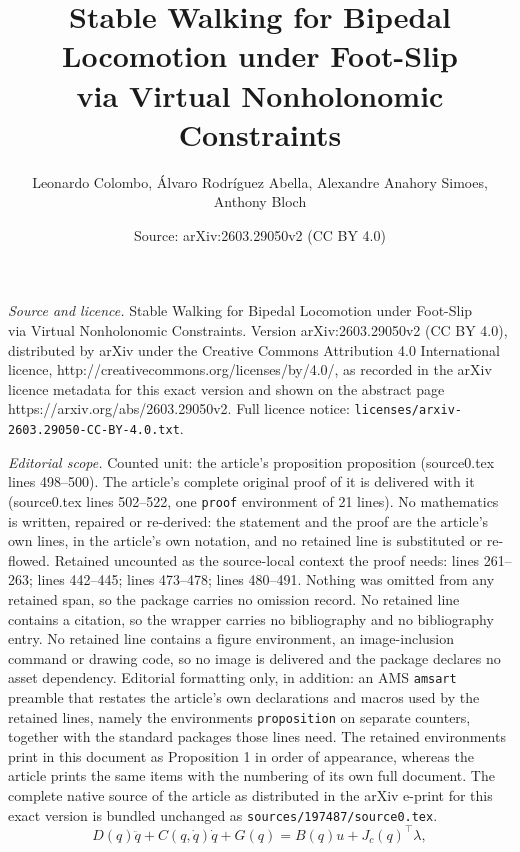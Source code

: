 \documentclass[10pt,a4paper]{amsart}
\title{Stable Walking for Bipedal Locomotion under Foot-Slip\\ via Virtual Nonholonomic Constraints}
\author{Leonardo Colombo, \'Alvaro Rodr\'iguez Abella, Alexandre Anahory Simoes, Anthony Bloch}
\date{Source: arXiv:2603.29050v2 (CC BY 4.0)}
\begin{document}
\maketitle

\noindent\emph{Source and licence.} Stable Walking for Bipedal Locomotion under Foot-Slip\\ via Virtual Nonholonomic Constraints. Version arXiv:2603.29050v2 (CC BY 4.0), distributed by arXiv under the Creative Commons Attribution 4.0 International licence, http://creativecommons.org/licenses/by/4.0/, as recorded in the arXiv licence metadata for this exact version and shown on the abstract page https://arxiv.org/abs/2603.29050v2. Full licence notice: \texttt{licenses/arxiv-2603.29050-CC-BY-4.0.txt}.\par\smallskip

\noindent\textit{Editorial scope.} Counted unit: the article's proposition proposition (source0.tex lines 498--500). The article's complete original proof of it is delivered with it (source0.tex lines 502--522, one \texttt{proof} environment of 21 lines). No mathematics is written, repaired or re-derived: the statement and the proof are the article's own lines, in the article's own notation, and no retained line is substituted or re-flowed.  Retained uncounted as the source-local context the proof needs: lines 261--263; lines 442--445; lines 473--478; lines 480--491.  Nothing was omitted from any retained span, so the package carries no omission record.  No retained line contains a citation, so the wrapper carries no bibliography and no bibliography entry.  No retained line contains a figure environment, an image-inclusion command or drawing code, so no image is delivered and the package declares no asset dependency.  Editorial formatting only, in addition: an AMS \texttt{amsart} preamble that restates the article's own declarations and macros used by the retained lines, namely the environments \texttt{proposition} on separate counters, together with the standard packages those lines need.  The retained environments print in this document as Proposition 1 in order of appearance, whereas the article prints the same items with the numbering of its own full document.  The complete native source of the article as distributed in the arXiv e-print for this exact version is bundled unchanged as \texttt{sources/197487/source0.tex}.
\begin{equation}\label{ELeq}
D(q)\ddot q + C(q,\dot q)\dot q + G(q) = B(q) u + J_c(q)^\top \lambda ,
\end{equation}
\end{document}
